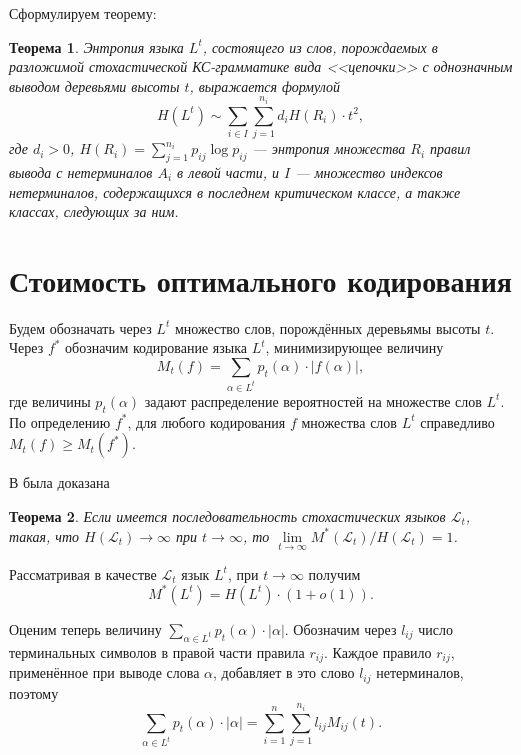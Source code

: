 \documentclass[12pt]{article}
\renewcommand{\geq}{\geqslant}
\newtheorem{theorem}{Теорема}
\begin{document}
{Сформулируем теорему:
\begin{theorem}
	Энтропия языка $L^t$, состоящего из слов, порождаемых в разложимой стохастической КС-грамматике вида <<цепочки>> с однозначным выводом деревьями высоты $t$, выражается формулой
	\begin{equation*}
		H(L^t) \sim \sum_{i \in I} \sum_{j=1}^{n_i} d_i H(R_i) \cdot t^2,
	\end{equation*}
	где $d_i > 0$, $H(R_i) = \sum_{j=1}^{n_i} p_{ij} \log p_{ij}$ --- энтропия множества $R_i$ правил вывода с нетерминалов $A_i$ в левой части, и $I$ --- множество индексов нетерминалов, содержащихся в последнем критическом классе, а также классах, следующих за ним.
\end{theorem}

\section{Стоимость оптимального кодирования}

Будем обозначать через $L^t$ множество слов, порождённых деревьямы высоты $t$. Через $f^*$ обозначим кодирование языка $L^t$, минимизирующее величину
\begin{equation*}
	M_t(f) = \sum_{\alpha \in L^t} p_t(\alpha) \cdot \left| f(\alpha) \right|,
\end{equation*}
где величины $p_t(\alpha)$ задают распределение вероятностей на множестве слов $L^t$. По определению $f^*$, для любого кодирования $f$ множества слов $L^t$ справедливо $M_t(f) \geq M_t(f^*)$.

В \cite{borisov-zakonom} была доказана
\begin{theorem}
	Если имеется последовательность стохастических языков $\mathcal{L}_t$, такая, что $H(\mathcal{L}_t) \rightarrow \infty$ при $t \rightarrow \infty$, то $\lim\limits_{t \rightarrow \infty} M^*(\mathcal{L}_t) / H(\mathcal{L}_t) = 1$.
\end{theorem}
Рассматривая в качестве $\mathcal{L}_t$ язык $L^t$, при $t \rightarrow \infty$ получим
\begin{equation}
\label{eq:m_h_sim}
	M^*(L^t) = H(L^t) \cdot (1 + o(1)).
\end{equation}

Оценим теперь величину $\sum_{\alpha \in L^t} p_t(\alpha) \cdot \left| \alpha \right|$. Обозначим через $l_{ij}$ число терминальных символов в правой части правила $r_{ij}$. Каждое правило $r_{ij}$, применённое при выводе слова $\alpha$, добавляет в это слово $l_{ij}$ нетерминалов, поэтому
\begin{equation*}
	\sum_{\alpha \in L^t} p_t(\alpha) \cdot \left| \alpha \right| = \sum_{i = 1}^n \sum_{j = 1}^{n_i} l_{ij} M_{ij}(t).
\end{equation*}

}
\end{document}
